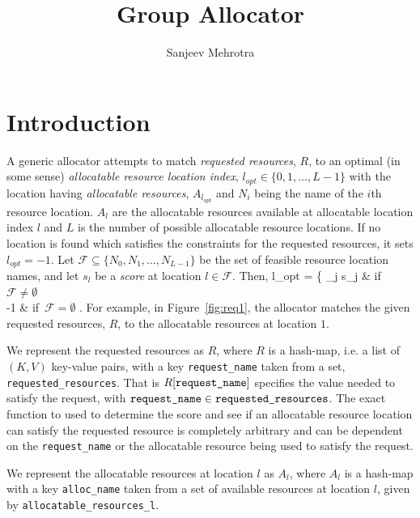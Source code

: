 \documentclass[12pt,onecolumn]{IEEEtran}
\title{Group Allocator}
\author{
{
  Sanjeev Mehrotra
}
}
\newcommand{\bus}{\_\allowbreak}
\begin{document}
\maketitle

\section{Introduction}
A generic allocator attempts to match {\em requested resources}, $R$, to
an optimal (in some sense)
{\em allocatable resource location index}, $l_{opt} \in \{0, 1, \dots, L-1\}$
with the location having {\em allocatable resources}, $A_{l_{opt}}$ and
$N_i$ being the name of the $i$th resource location.
$A_l$ are the allocatable resources available at allocatable location index
$l$ and 
$L$ is the number of possible allocatable resource locations.
If no location is found which satisfies the constraints for the requested
resources, it sets $l_{opt}=-1$.
Let $\mathcal{F} \subseteq \{N_0,N_1,\dots,N_{L-1}\}$ be the set of feasible
resource location names, 
and let $s_l$ be a {\em score} at location $l \in \mathcal{F}$.
Then,
\bea
l_{opt} = \left\{
\argmax_{j \in {}} s_j & \mbox{if $\mathcal{F} \neq \emptyset$} \\
-1 & \mbox{if $\mathcal{F} = \emptyset$}
\ea
\right.
\eea
For example, in Figure~\ref{fig:req1}, 
the allocator matches the given requested resources, $R$,
to the allocatable resources at location $1$.

We represent the requested resources as $R$, where $R$ is a hash-map,
i.e. a list of $(K,V)$ key-value pairs,
with a key \texttt{request{\bus}name} taken from a set,
\texttt{requested{\bus}resources}.
That is $R[\texttt{request{\bus}name}]$ specifies the value needed
to satisfy the request, with 
$\texttt{request{\bus}name} \in \texttt{requested{\bus}resources}$.
The exact function to used to determine the score and see if an 
allocatable resource location can satisfy the requested resource
is completely arbitrary and can be dependent on the \texttt{request{\bus}name}
or the allocatable resource being used to satisfy the request.

We represent the allocatable resources at location $l$ as
$A_l$, where $A_l$ is a hash-map with a key
\texttt{alloc{\bus}name} taken from a set of available
resources at location $l$, given by \texttt{allocatable{\bus}resources{\bus}l}.
\end{document}
